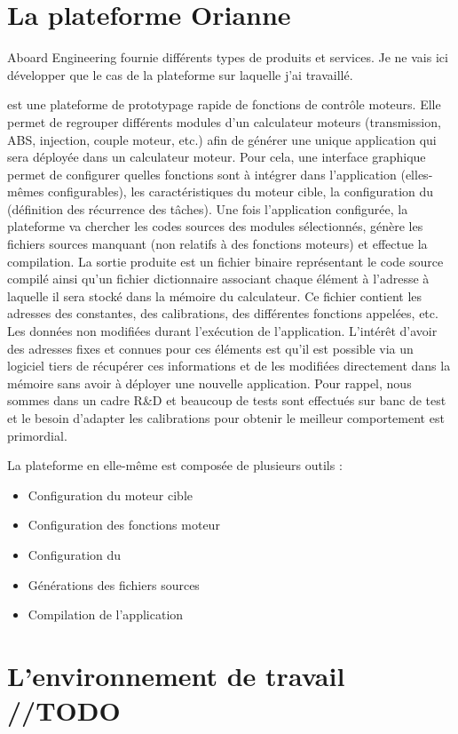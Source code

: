 \section{La plateforme Orianne}
\label{sec:orianne}

Aboard Engineering fournie différents types de produits et services. Je ne vais ici développer que le cas de la plateforme  sur laquelle j'ai travaillé.

 est une plateforme de prototypage rapide de fonctions de contrôle moteurs.
Elle permet de regrouper différents modules d'un calculateur moteurs (transmission, ABS, injection, couple moteur, etc.) afin de générer une unique application qui sera déployée dans un calculateur moteur.
Pour cela, une interface graphique permet de configurer quelles fonctions sont à intégrer dans l'application (elles-mêmes configurables), les caractéristiques du moteur cible, la configuration du  (définition des récurrence des tâches).
Une fois l'application configurée, la plateforme va chercher les codes sources des modules sélectionnés, génère les fichiers sources manquant (non relatifs à des fonctions moteurs) et effectue la compilation.
La sortie produite est un fichier binaire représentant le code source compilé ainsi qu'un fichier \og dictionnaire \fg{} associant chaque élément à l'adresse à laquelle il sera stocké dans la mémoire du calculateur. Ce fichier contient les adresses des constantes, des calibrations, des différentes fonctions appelées, etc. Les données non modifiées durant l'exécution de l'application.
L'intérêt d'avoir des adresses fixes et connues pour ces éléments est qu'il est possible via un logiciel tiers de récupérer ces informations et de les modifiées directement dans la mémoire sans avoir à déployer une nouvelle application. Pour rappel, nous sommes dans un cadre R\&D et beaucoup de tests sont effectués sur banc de test et le besoin d'adapter les calibrations pour obtenir le meilleur comportement est primordial.

La plateforme en elle-même est composée de plusieurs outils :
\begin{itemize}
	\item Configuration du moteur cible
	\item Configuration des fonctions moteur
	\item Configuration du 
	\item Générations des fichiers sources
	\item Compilation de l'application
\end{itemize}

\section{L'environnement de travail //TODO}
\lipsum
